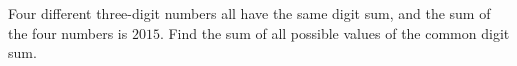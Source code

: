 Four different three-digit numbers all have the same digit sum, and the sum of the four numbers is $2015$. Find the sum of all possible values of the common digit sum.
